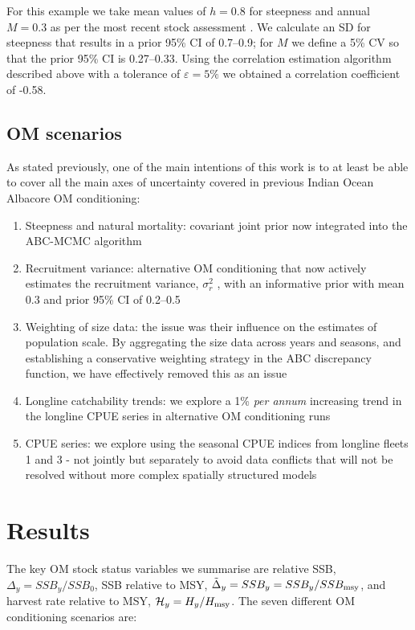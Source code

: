 \documentclass[11pt]{article}
\newcommand{\veps}{\varepsilon}
\newcommand{\sigr}{\sigma^2_r}
\begin{document}
For this example we take mean values of $h = 0.8$ for steepness and annual $M = 0.3$ as per the most recent stock assessment \cite{albsa}. We calculate an SD for steepness that results in a prior 95\% CI of 0.7--0.9; for $M$ we define a 5\% CV so that the prior 95\% CI is 0.27--0.33. Using the correlation estimation algorithm described above with a tolerance of $\veps = 5\%$ we obtained a correlation coefficient of -0.58.

\subsection{OM scenarios}

As stated previously, one of the main intentions of this work is to at least be able to cover all the main axes of uncertainty covered in previous Indian Ocean Albacore OM conditioning:

\begin{enumerate}
    \item Steepness and natural mortality: covariant joint prior now integrated into the ABC-MCMC algorithm
    \item Recruitment variance: alternative OM conditioning that now actively estimates the recruitment variance, $\sigr$ , with an informative prior with mean 0.3 and prior 95\% CI of 0.2--0.5
    \item Weighting of size data: the issue was their influence on the estimates of population scale. By aggregating the size data across years and seasons, and establishing a conservative weighting strategy in the ABC discrepancy function, we have effectively removed this as an issue
    \item Longline catchability trends: we explore a 1\% \textit{per annum} increasing trend in the longline CPUE series in alternative OM conditioning runs
    \item CPUE series: we explore using the seasonal CPUE indices from longline fleets 1 and 3 - not jointly but separately to avoid data conflicts that will not be resolved without more complex spatially structured models
\end{enumerate}

\section{Results}

The key OM stock status variables we summarise are relative SSB, $\Delta_y=SSB_y/SSB_0$, SSB relative to MSY, $\tilde{\Delta}_y=SSB_y=SSB_y/SSB_{\rm msy}$, and harvest rate relative to MSY, $\mathcal{H}_y=H_y/H_{\rm msy}$. The seven different OM conditioning scenarios are:
\end{document}
